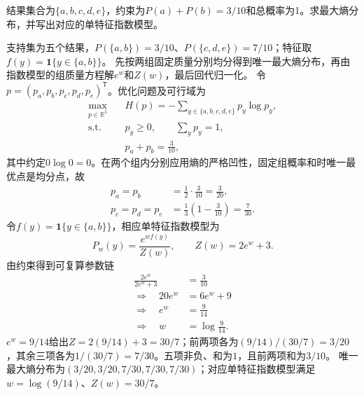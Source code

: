 \label{struct:V3-C01-CH18}
\label{struct:V3-C01-CH32}
\begin{example}[两事件约束的最大熵分布]\label{exm:V3-C01-two-groups}
结果集合为$\{a,b,c,d,e\}$，约束为$P(a)+P(b)=3/10$和总概率为1。求最大熵分布，并写出对应的单特征指数模型。

\label{struct:V3-C01-CH33}
\end{example}
\begin{solution}
\SolGiven 支持集为五个结果，$P(\{a,b\})=3/10$、$P(\{c,d,e\})=7/10$；特征取$f(y)=\mathbf1\{y\in\{a,b\}\}$。
\SolPlan 先按两组固定质量分别均分得到唯一最大熵分布，再由指数模型的组质量方程解$e^w$和$Z(w)$，最后回代归一化。
\SolDerive
令$p=(p_a,p_b,p_c,p_d,p_e)^{\mathsf T}$。优化问题及可行域为
\[
\begin{aligned}
\max_{p\in\mathbb R^5}\quad
&H(p)=-\sum_{y\in\{a,b,c,d,e\}}p_y\log p_y,\\
\text{s.t.}\quad
&p_y\geq0,\qquad \sum_y p_y=1,\\
&p_a+p_b=\frac{3}{10},
\end{aligned}
\]
其中约定$0\log0=0$。在两个组内分别应用熵的严格凹性，固定组概率和时唯一最优点是均分点，故
\[
\begin{aligned}
p_a=p_b&=\frac12\cdot\frac{3}{10}=\frac{3}{20},\\
p_c=p_d=p_e&=\frac13\left(1-\frac{3}{10}\right)=\frac{7}{30}.
\end{aligned}
\]
令$f(y)=\mathbf1\{y\in\{a,b\}\}$，相应单特征指数模型为
\[
P_w(y)=\frac{e^{wf(y)}}{Z(w)},
\qquad
Z(w)=2e^w+3.
\]
由约束得到可复算参数链
\[
\begin{aligned}
\frac{2e^w}{2e^w+3}&=\frac{3}{10}\\
\Longrightarrow\quad 20e^w&=6e^w+9\\
\Longrightarrow\quad e^w&=\frac{9}{14}\\
\Longrightarrow\quad w&=\log\frac{9}{14}.
\end{aligned}
\]
\SolCheck $e^w=9/14$给出$Z=2(9/14)+3=30/7$；前两项各为$(9/14)/(30/7)=3/20$，其余三项各为$1/(30/7)=7/30$。五项非负、和为$1$，且前两项和为$3/10$。
\SolAnswer 唯一最大熵分布为$(3/20,3/20,7/30,7/30,7/30)$；对应单特征指数模型满足$w=\log(9/14)$、$Z(w)=30/7$。
\end{solution}

